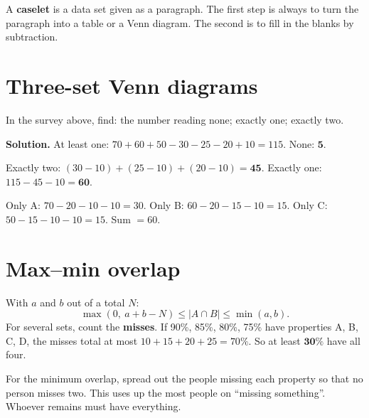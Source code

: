 \documentclass[11pt,a4paper,openany]{report}
\begin{document}
A \textbf{caselet} is a data set given as a paragraph. The first step is always to turn the paragraph into a table or a Venn diagram. The second is to fill in the blanks by subtraction.

\section{Three-set Venn diagrams}
\begin{center}
\end{center}
\begin{example}
In the survey above, find: the number reading none; exactly one; exactly two.

\textbf{Solution.} At least one: $70+60+50-30-25-20+10=115$. None: $\mathbf{5}$.

Exactly two: $(30-10)+(25-10)+(20-10)=\mathbf{45}$. Exactly one: $115-45-10=\mathbf{60}$.

Only A: $70-20-10-10=30$. Only B: $60-20-15-10=15$. Only C: $50-15-10-10=15$. Sum $=60$. \checkmark
\end{example}

\section{Max--min overlap}
\begin{idea}
With $a$ and $b$ out of a total $N$:
\[\max(0,\ a+b-N)\le|A\cap B|\le\min(a,b).\]
For several sets, count the \textbf{misses}. If 90\%, 85\%, 80\%, 75\% have properties A, B, C, D, the misses total at most $10+15+20+25=70\%$. So at least $\mathbf{30\%}$ have all four.
\end{idea}
\begin{why}
For the minimum overlap, spread out the people missing each property so that no person misses two. This uses up the most people on ``missing something''. Whoever remains must have everything.
\end{why}
\end{document}
